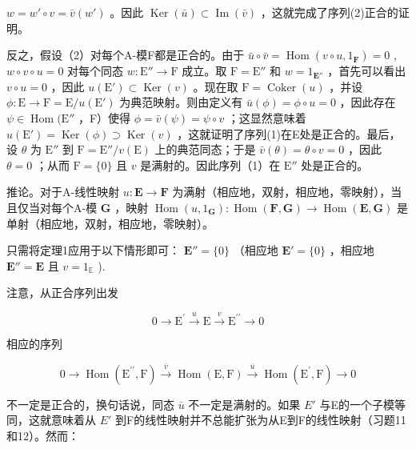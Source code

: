 \(w = w' \circ v = \bar{v}(w')\) 。因此 \(\operatorname{Ker}(\bar{u}) \subset \operatorname{Im}(\bar{v})\) ，这就完成了序列(2)正合的证明。

反之，假设（2）对每个A-模F都是正合的。由于 \(\bar{u} \circ \bar{v} = \operatorname{Hom}(v \circ u, 1_{\mathbf{F}}) = 0\) , \(w \circ v \circ u = 0\) 对每个同态 \(w: \mathrm{E}'' \to \mathrm{F}\) 成立。取 \(\mathrm{F} = \mathrm{E}''\) 和 \(w = 1_{\mathbf{E}''}\) ，首先可以看出 \(v \circ u = 0\) ，因此 \(u(\mathrm{E}') \subset \operatorname{Ker}(v)\) 。现在取 \(\mathrm{F} = \operatorname{Coker}(u)\) ，并设 \(\phi: \mathrm{E} \to \mathrm{F} = \mathrm{E}/u(\mathrm{E}')\) 为典范映射。则由定义有 \(\bar{u}(\phi) = \phi \circ u = 0\) ，因此存在 \(\psi \in \operatorname{Hom}(\mathrm{E}''\) ，F）使得 \(\phi = \bar{v}(\psi) = \psi \circ v\) ；这显然意味着 \(u(\mathrm{E}') = \operatorname{Ker}(\phi) \supset \operatorname{Ker}(v)\) ，这就证明了序列(1)在E处是正合的。最后，设 \(\theta\) 为 \(\mathrm{E}''\) 到 \(\mathrm{F} = \mathrm{E}''/v(\mathrm{E})\) 上的典范同态；于是 \(\bar{v}(\theta) = \theta \circ v = 0\) ，因此 \(\theta = 0\) ；从而 \(\mathrm{F} = \{0\}\) 且 \(v\) 是满射的。因此序列（1）在 \(\mathrm{E}''\) 处是正合的。

推论。对于A-线性映射 \(u: \mathbf{E} \to \mathbf{F}\) 为满射（相应地，双射，相应地，零映射），当且仅当对每个A-模 \(\mathbf{G}\) ，映射 \(\operatorname{Hom}(u, 1_{\mathbf{G}}): \operatorname{Hom}(\mathbf{F}, \mathbf{G}) \to \operatorname{Hom}(\mathbf{E}, \mathbf{G})\) 是单射（相应地，双射，相应地，零映射）。

只需将定理1应用于以下情形即可： \(\mathbf{E}'' = \{0\}\) （相应地 \(\mathbf{E}' = \{0\}\) ，相应地 \(\mathbf{E}'' = \mathbf{E}\) 且 \(v = 1_{\mathbb{E}}\) ).

注意，从正合序列出发

\[
0 \longrightarrow \mathrm{E} ^ {\prime} \stackrel {u} {\longrightarrow} \mathrm{E} \stackrel {v} {\longrightarrow} \mathrm{E} ^ {\prime \prime} \longrightarrow 0
\]

相应的序列

\[
0 \longrightarrow \operatorname{Hom} (\mathrm{E} ^ {\prime \prime}, \mathrm{F}) \stackrel {\bar {v}} {\longrightarrow} \operatorname{Hom} (\mathrm{E}, \mathrm{F}) \stackrel {\bar {u}} {\longrightarrow} \operatorname{Hom} (\mathrm{E} ^ {\prime}, \mathrm{F}) \longrightarrow 0
\]

不一定是正合的，换句话说，同态 \(\bar{u}\) 不一定是满射的。如果 \(E'\) 与E的一个子模等同，这就意味着从 \(E'\) 到F的线性映射并不总能扩张为从E到F的线性映射（习题11和12）。然而：

